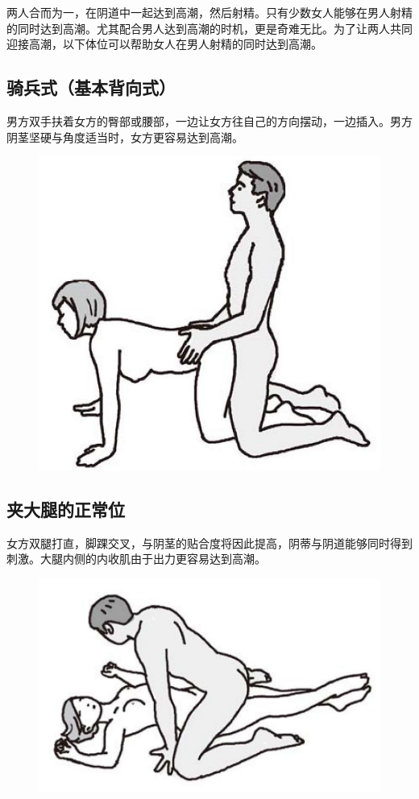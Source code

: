 \documentclass[12pt,UTF8]{ctexbook}
\begin{document}
两人合而为一，在阴道中一起达到高潮，然后射精。只有少数女人能够在男人射精的同时达到高潮。尤其配合男人达到高潮的时机，更是奇难无比。为了让两人共同迎接高潮，以下体位可以帮助女人在男人射精的同时达到高潮。

\subsection{骑兵式（基本背向式）}

男方双手扶着女方的臀部或腰部，一边让女方往自己的方向摆动，一边插入。男方阴茎坚硬与角度适当时，女方更容易达到高潮。

\begin{figure}[htbp]
\centering
\includegraphics[width=0.7\linewidth]{tw23}
\caption{}
\label{fig:1}
\end{figure}

\subsection{夹大腿的正常位}

女方双腿打直，脚踝交叉，与阴茎的贴合度将因此提高，阴蒂与阴道能够同时得到刺激。大腿内侧的内收肌由于出力更容易达到高潮。

\begin{figure}[htbp]
\centering
\includegraphics[width=0.7\linewidth]{tw24}
\caption{}
\label{fig:1}
\end{figure}
\end{document}
